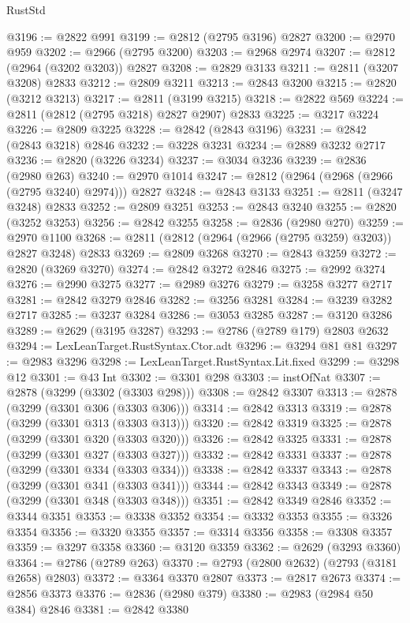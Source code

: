 \begin{lexlean}{RustStd}
\begin{coremodule}
{\begin{coremodule}
{{{{{{{{{{{{{{{{{{{{{{{{{{{{{{{{{@3196 := @2822 @991
@3199 := @2812 (@2795 @3196) @2827
@3200 := @2970 @959
@3202 := @2966 (@2795 @3200)
@3203 := @2968 @2974
@3207 := @2812 (@2964 (@3202 @3203)) @2827
@3208 := @2829 @3133
@3211 := @2811 (@3207 @3208) @2833
@3212 := @2809 @3211
@3213 := @2843 @3200
@3215 := @2820 (@3212 @3213)
@3217 := @2811 (@3199 @3215)
@3218 := @2822 @569
@3224 := @2811 (@2812 (@2795 @3218) @2827 @2907) @2833
@3225 := @3217 @3224
@3226 := @2809 @3225
@3228 := @2842 (@2843 @3196)
@3231 := @2842 (@2843 @3218) @2846
@3232 := @3228 @3231
@3234 := @2889 @3232 @2717
@3236 := @2820 (@3226 @3234)
@3237 := @3034 @3236
@3239 := @2836 (@2980 @263)
@3240 := @2970 @1014
@3247 := @2812 (@2964 (@2968 (@2966 (@2795 @3240) @2974))) @2827
@3248 := @2843 @3133
@3251 := @2811 (@3247 @3248) @2833
@3252 := @2809 @3251
@3253 := @2843 @3240
@3255 := @2820 (@3252 @3253)
@3256 := @2842 @3255
@3258 := @2836 (@2980 @270)
@3259 := @2970 @1100
@3268 := @2811 (@2812 (@2964 (@2966 (@2795 @3259) @3203)) @2827 @3248) @2833
@3269 := @2809 @3268
@3270 := @2843 @3259
@3272 := @2820 (@3269 @3270)
@3274 := @2842 @3272 @2846
@3275 := @2992 @3274
@3276 := @2990 @3275
@3277 := @2989 @3276
@3279 := @3258 @3277 @2717
@3281 := @2842 @3279 @2846
@3282 := @3256 @3281
@3284 := @3239 @3282 @2717
@3285 := @3237 @3284
@3286 := @3053 @3285
@3287 := @3120 @3286
@3289 := @2629 (@3195 @3287)
@3293 := @2786 (@2789 @179) @2803 @2632
@3294 := LexLeanTarget.RustSyntax.Ctor.adt
@3296 := @3294 @81 @81
@3297 := @2983 @3296
@3298 := LexLeanTarget.RustSyntax.Lit.fixed
@3299 := @3298 @12
@3301 := @43 Int
@3302 := @3301 @298
@3303 := instOfNat
@3307 := @2878 (@3299 (@3302 (@3303 @298)))
@3308 := @2842 @3307
@3313 := @2878 (@3299 (@3301 @306 (@3303 @306)))
@3314 := @2842 @3313
@3319 := @2878 (@3299 (@3301 @313 (@3303 @313)))
@3320 := @2842 @3319
@3325 := @2878 (@3299 (@3301 @320 (@3303 @320)))
@3326 := @2842 @3325
@3331 := @2878 (@3299 (@3301 @327 (@3303 @327)))
@3332 := @2842 @3331
@3337 := @2878 (@3299 (@3301 @334 (@3303 @334)))
@3338 := @2842 @3337
@3343 := @2878 (@3299 (@3301 @341 (@3303 @341)))
@3344 := @2842 @3343
@3349 := @2878 (@3299 (@3301 @348 (@3303 @348)))
@3351 := @2842 @3349 @2846
@3352 := @3344 @3351
@3353 := @3338 @3352
@3354 := @3332 @3353
@3355 := @3326 @3354
@3356 := @3320 @3355
@3357 := @3314 @3356
@3358 := @3308 @3357
@3359 := @3297 @3358
@3360 := @3120 @3359
@3362 := @2629 (@3293 @3360)
@3364 := @2786 (@2789 @263)
@3370 := @2793 (@2800 @2632) (@2793 (@3181 @2658) @2803)
@3372 := @3364 @3370 @2807
@3373 := @2817 @2673
@3374 := @2856 @3373
@3376 := @2836 (@2980 @379)
@3380 := @2983 (@2984 @50 @384) @2846
@3381 := @2842 @3380
}}}}}}}}}}}}}}}}}}}}}}}}}}}}}}}}}
\end{coremodule}}
\end{coremodule}
\end{lexlean}
